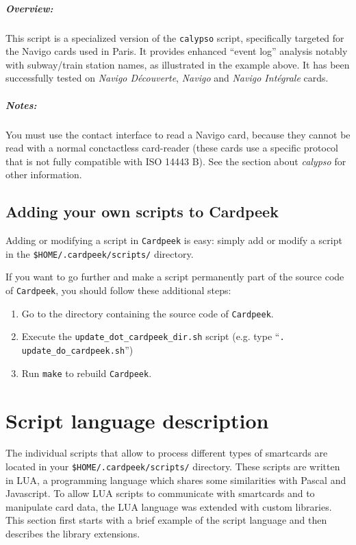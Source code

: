 \documentclass[11pt]{report}
\begin{document}
\paragraph{Overview:}
This script is a specialized version of the \texttt{calypso} script, specifically targeted for the Navigo cards used in Paris.
It provides enhanced ``event log'' analysis notably with subway/train station names, as illustrated in the example above.
It has been successfully tested on \emph{Navigo D\'ecouverte}, \emph{Navigo} and \emph{Navigo Int\'egrale} cards.

\paragraph{Notes:}
You must use the contact interface to read a Navigo card, because they cannot be read with a normal conctactless card-reader (these cards use a specific protocol that is not fully compatible with ISO 14443 B).
See the section about \emph{calypso} for other information.

\section{Adding your own scripts to Cardpeek}
Adding or modifying a script in \texttt{Cardpeek} is easy: simply add or modify a script in the \texttt{\$HOME/.cardpeek/scripts/} directory.

If you want to go further and make a script permanently part of the source code of \texttt{Cardpeek}, you should follow these additional steps:
\begin{enumerate}
\item{Go to the directory containing the source code of \texttt{Cardpeek}.}
\item{Execute the \texttt{update\_dot\_cardpeek\_dir.sh} script (e.g. type ``\texttt{. update\_do\_cardpeek.sh}'')}
\item{Run \texttt{make} to rebuild \texttt{Cardpeek}.}
\end{enumerate}

\chapter{Script language description}

The individual scripts that allow to process different types of smartcards are located in your \texttt{\$HOME/.cardpeek/scripts/} directory.
These scripts are written in LUA, a programming language which shares some similarities with Pascal and Javascript.
To allow LUA scripts to communicate with smartcards and to manipulate card data, the LUA language was extended with custom libraries.
This section first starts with a brief example of the script language and then describes the library extensions.
\end{document}
